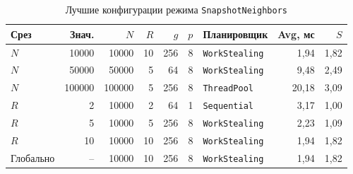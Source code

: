 \begin{table}[ht]
\centering
\scriptsize
\caption{Лучшие конфигурации режима \texttt{SnapshotNeighbors}}
\label{tab:interaction-snapshot-best}
\begin{tabularx}{\textwidth}{|l|r|r|r|r|r|>{\raggedright\arraybackslash}X|r|r|}
\hline
Срез & Знач. & $N$ & $R$ & $g$ & $p$ & Планировщик & Avg, мс & $S$ \\
\hline
$N$ & 10000 & 10000 & 10 & 256 & 8 & \texttt{WorkStealing} & 1{,}94 & 1{,}82 \\
$N$ & 50000 & 50000 & 5 & 64 & 8 & \texttt{WorkStealing} & 9{,}48 & 2{,}49 \\
$N$ & 100000 & 100000 & 5 & 256 & 8 & \texttt{ThreadPool} & 20{,}18 & 3{,}09 \\
\hline
$R$ & 2 & 10000 & 2 & 64 & 1 & \texttt{Sequential} & 3{,}17 & 1{,}00 \\
$R$ & 5 & 10000 & 5 & 256 & 8 & \texttt{WorkStealing} & 2{,}23 & 1{,}09 \\
$R$ & 10 & 10000 & 10 & 256 & 8 & \texttt{WorkStealing} & 1{,}94 & 1{,}82 \\
\hline
Глобально & -- & 10000 & 10 & 256 & 8 & \texttt{WorkStealing} & 1{,}94 & 1{,}82 \\
\hline
\end{tabularx}
\end{table}
